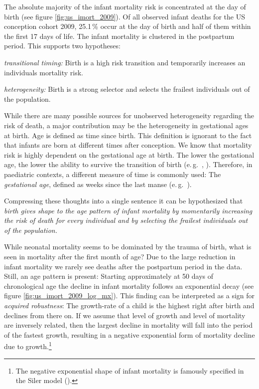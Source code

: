 \documentclass[12pt, parskip=half]{scrartcl}
\begin{document}
The absolute majority of the infant mortality risk is concentrated at the day of birth (see figure \ref{fig:us_imort_2009}). Of all observed infant deaths for the US conception cohort 2009, 25.1\,\% occur at the day of birth and half of them within the first 17 days of life. The infant mortality is clustered in the postpartum period. This supports two hypotheses:
\begin{inparaenum}
  \item \emph{transitional timing:} Birth is a high risk transition and temporarily increases an individuals mortality risk.
  \item \emph{heterogeneity:} Birth is a strong selector and selects the frailest individuals out of the population.
\end{inparaenum}
While there are many possible sources for unobserved heterogeneity regarding the risk of death, a major contribution may be the heterogeneity in gestational ages at birth. Age is defined as time since birth. This definition is ignorant to the fact that infants are born at different times after conception. We know that mortality risk is highly dependent on the gestational age at birth. The lower the gestational age, the lower the ability to survive the transition of birth (e.\,g.~\cite{Lubchenco1972}, \cite{Draper1999}). Therefore, in paediatric contexts, a different measure of time is commonly used: The \emph{gestational age}, defined as weeks since the last manse (e.\,g.~\cite{AAPCFN2004}).

Compressing these thoughts into a single sentence it can be hypothesized that \emph{birth gives shape to the age pattern of infant mortality by momentarily increasing the risk of death for every individual and by selecting the frailest individuals out of the population.}

While neonatal mortality seems to be dominated by the trauma of birth, what is seen in mortality after the first month of age? Due to the large reduction in infant mortality we rarely see deaths after the postpartum period in the data. Still, an age pattern is present: Starting approximately at 50 days of chronological age the decline in infant mortality follows an exponential decay (see figure \ref{fig:us_imort_2009_log_mx}). This finding can be interpreted as a sign for \emph{acquired robustness}: The growth-rate of a child is the highest right after birth and declines from there on. If we assume that level of growth and level of mortality are inversely related, then the largest decline in mortality will fall into the period of the fastest growth, resulting in a negative exponential form of mortality decline due to growth.\footnote{The negative exponential shape of infant mortality is famously specified in the Siler model (\cite{Siler1979}).}
\end{document}

